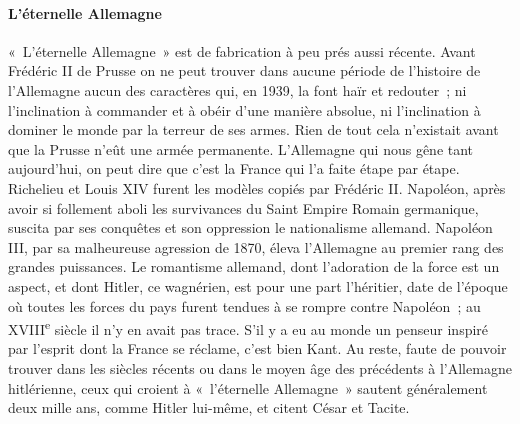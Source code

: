 \documentclass[french,twoside]{book} %
\begin{document}
\paragraph[L'éternelle Allemagne]{L'éternelle Allemagne}
\noindent \par
« L'éternelle Allemagne » est de fabrication à peu prés aussi récente. Avant Frédéric II de Prusse on ne peut trouver dans aucune période de l'histoire de l'Allemagne aucun des caractères qui, en 1939, la font haïr et redouter ; ni l'inclination à commander et à obéir d'une manière absolue, ni l'inclination à dominer le monde par la terreur de ses armes. Rien de tout cela n'existait avant que la Prusse n'eût une armée permanente. L'Allemagne qui nous gêne tant aujourd'hui, on peut dire que c'est la France qui l'a faite étape par étape. Richelieu et Louis XIV furent les modèles copiés par Frédéric II. Napoléon, après avoir si follement aboli les survivances du Saint Empire Ro­main germanique, suscita par ses conquêtes et son oppression le nationalisme allemand. Napoléon III, par sa malheureuse agression de 1870, éleva l'Alle­magne au premier rang des grandes puissances. Le romantisme allemand, dont l'adoration de la force est un aspect, et dont Hitler, ce wagnérien, est pour une part l'héritier, date de l'époque où toutes les forces du pays furent tendues à se rompre contre Napoléon ; au XVIII\textsuperscript{e} siècle il n'y en avait pas trace. S'il y a eu au monde un penseur inspiré par l'esprit dont la France se réclame, c'est bien Kant. Au reste, faute de pouvoir trouver dans les siècles récents ou dans le moyen âge des précédents à l'Allemagne hitlérienne, ceux qui croient à « l'éternelle Allemagne » sautent généralement deux mille ans, comme Hitler lui-même, et citent César et Tacite.
\end{document}
